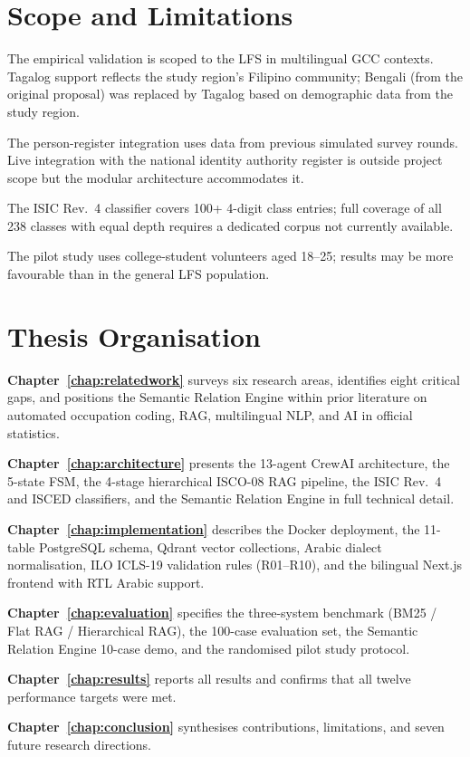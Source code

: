 \section{Scope and Limitations}
\label{sec:scope}

The empirical validation is scoped to the LFS in multilingual GCC contexts.
Tagalog support reflects the study region's Filipino community; Bengali (from the
original proposal) was replaced by Tagalog based on demographic data from the study region.

The person-register integration uses data from previous simulated survey rounds.
Live integration with the national identity authority
register is outside project scope but the modular architecture accommodates it.

The ISIC Rev.~4 classifier covers 100+ 4-digit class entries; full coverage of
all 238 classes with equal depth requires a dedicated corpus not currently
available.

The pilot study uses college-student volunteers aged 18--25; results may be
more favourable than in the general LFS population.

\section{Thesis Organisation}
\label{sec:organisation}

\noindent\textbf{Chapter~\ref{chap:relatedwork}} surveys six research areas, identifies
eight critical gaps, and positions the Semantic Relation Engine within prior
literature on automated occupation coding, RAG, multilingual NLP, and AI in
official statistics.

\noindent\textbf{Chapter~\ref{chap:architecture}} presents the 13-agent CrewAI
architecture, the 5-state FSM, the 4-stage hierarchical ISCO-08 RAG pipeline,
the ISIC Rev.~4 and ISCED classifiers, and the Semantic Relation Engine in full
technical detail.

\noindent\textbf{Chapter~\ref{chap:implementation}} describes the Docker deployment,
the 11-table PostgreSQL schema, Qdrant vector collections, Arabic dialect
normalisation, ILO ICLS-19 validation rules (R01--R10), and the bilingual
Next.js frontend with RTL Arabic support.

\noindent\textbf{Chapter~\ref{chap:evaluation}} specifies the three-system benchmark
(BM25 / Flat RAG / Hierarchical RAG), the 100-case evaluation set, the Semantic
Relation Engine 10-case demo, and the randomised pilot study protocol.

\noindent\textbf{Chapter~\ref{chap:results}} reports all results and confirms that all
twelve performance targets were met.

\noindent\textbf{Chapter~\ref{chap:conclusion}} synthesises contributions, limitations,
and seven future research directions.
